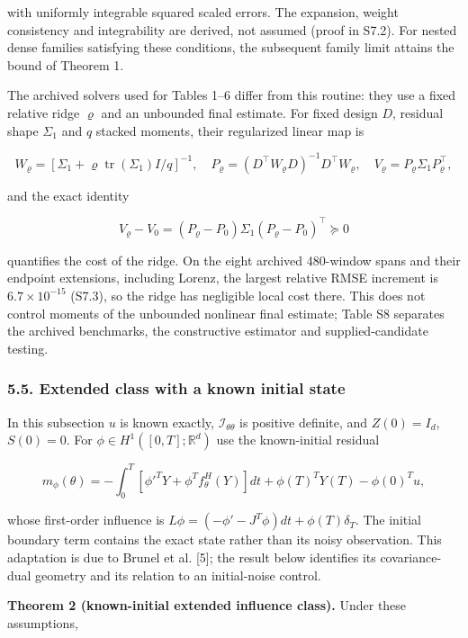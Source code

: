 \documentclass[
  american,
  11pt,
]{article}
\begin{document}
with uniformly integrable squared scaled errors. The expansion, weight
consistency and integrability are derived, not assumed (proof in S7.2).
For nested dense families satisfying these conditions, the subsequent
family limit attains the bound of Theorem 1.

The archived solvers used for Tables 1--6 differ from this routine: they
use a fixed relative ridge \(\varrho\) and an unbounded final estimate.
For fixed design \(D\), residual shape \(\Sigma_1\) and \(q\) stacked
moments, their regularized linear map is

\[
W_\varrho=[\Sigma_1+\varrho\operatorname{tr}(\Sigma_1)I/q]^{-1},\quad
P_\varrho=(D^\top W_\varrho D)^{-1}D^\top W_\varrho,\quad
V_\varrho=P_\varrho\Sigma_1P_\varrho^\top,
\]

and the exact identity

\[
V_\varrho-V_0=(P_\varrho-P_0)\Sigma_1(P_\varrho-P_0)^\top\succeq0
\]

quantifies the cost of the ridge. On the eight archived 480-window spans
and their endpoint extensions, including Lorenz, the largest relative
RMSE increment is \(6.7\times10^{-15}\) (S7.3), so the ridge has
negligible local cost there. This does not control moments of the
unbounded nonlinear final estimate; Table S8 separates the archived
benchmarks, the constructive estimator and supplied-candidate testing.

\subsubsection{5.5. Extended class with a known initial
state}\label{extended-class-with-a-known-initial-state}

In this subsection \(u\) is known exactly, \(\mathcal I_{\theta\theta}\)
is positive definite, and \(Z(0)=I_d\), \(S(0)=0\). For
\(\phi\in H^1([0,T];\mathbb R^d)\) use the known-initial residual

\[
m_\phi(\theta)=-\int_0^T[\phi'^TY+\phi^Tf_\theta^H(Y)]dt
+\phi(T)^TY(T)-\phi(0)^Tu,
\]

whose first-order influence is
\(L\phi=(-\phi'-J^T\phi)dt+\phi(T)\delta_T\). The initial boundary term
contains the exact state rather than its noisy observation. This
adaptation is due to Brunel et al. {[}5{]}; the result below identifies
its covariance-dual geometry and its relation to an initial-noise
control.

\textbf{Theorem 2 (known-initial extended influence class).} Under these
assumptions,
\end{document}
